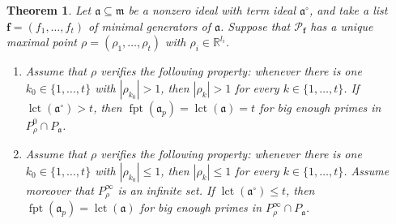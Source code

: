 \documentclass[12pt]{amsart}
\newtheorem{theorem}{Theorem}[section]
\theoremstyle{definition}
\numberwithin{equation}{subsection}
\DeclareMathOperator{\fpt}{fpt}
\newcommand{\lct}{{\operatorname{lct}}}
\newcommand{\RR}{\mathbb{R}}
\newcommand{\m}{\mathfrak{m}}
\newcommand{\fa}{\mathfrak{a}}
\newcommand{\SP}{\mathcal{P}}
\newcommand{\Bf}{\boldsymbol{f}}
\renewcommand{\!}[1]{{\color{red}\text{\Huge$\star$ }#1}}
\begin{document}
\begin{theorem}\label{Thm:fpt-equals-lct}
	Let $\fa \subseteq \m$ be a nonzero ideal with term ideal $\fa^\circ$, and take a list $\Bf=(f_1,\ldots,f_t)$  of minimal generators of $\fa$. Suppose that $\SP_{\Bf}$ has a unique maximal point $\rho=(\rho_1, \ldots, \rho_t)$ with $\rho_i \in \RR^{l_i}$. 
	\begin{enumerate}
		\item Assume that $\rho$ verifies the following property: whenever there is one $k_0\in\{1,\ldots,t\}$ with $|\rho_{k_0}|>1$, then $|\rho_k|>1$ for every $k\in\{1,\ldots,t\}$. If $\lct(\fa^\circ)>t$, then $\fpt(\fa_p)=\lct(\fa)=t$ for big enough primes in  $P_\rho^0\cap P_\fa$. 
		
		\item Assume that $\rho$ verifies the following property: whenever there is one $k_0\in\{1,\ldots,t\}$ with $|\rho_{k_0}|\leq 1$, then $|\rho_k|\leq 1$ for every $k\in\{1,\ldots,t\}$. Assume moreover that $P_\rho^\infty$ is an infinite set. If $\lct(\fa^\circ)\leq t$, then $\fpt(\fa_p)=\lct(\fa)$ for big enough primes in  $P_\rho^\infty\cap P_\fa$.
	\end{enumerate}	
\end{theorem}
\end{document}
